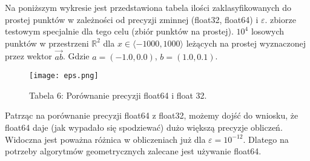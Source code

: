 \quad Na poniższym wykresie jest przedstawiona tabela ilości 
zaklasyfikowanych do prostej punktów w zależności od precyzji zminnej (float32, float64) i 
$\varepsilon$.
zbiorze testowym specjalnie dla tego celu (zbiór punktów na prostej).
$ 10^4$ losowych punktów w przestrzeni $\mathbb{R}^2$ dla $ x \in \langle -1000,1000 \rangle$ leżących na prostej wyznaczonej przez wektor $ \overrightarrow{ab}$.   
    Gdzie $ a = (-1.0, 0.0)$, $ b = (1.0, 0.1)$.
\\
\begin{figure}[hbt]
    \centering
    \texttt{[image: eps.png]}
    \caption*{Tabela 6: Porównanie precyzji float64 i float 32.}
\end{figure}
\par
\quad Patrząc na porównanie precyzji float64 z float32, możemy dojść do wniosku, 
że float64 daje (jak wypadało się spodziewać) dużo większą precyzje obliczeń. 
Widoczna jest poważna różnica w obliczeniach już dla $\varepsilon = 10^{-12}$. 
Dlatego na potrzeby algorytmów geometrycznych zalecane jest 
używanie float64.
